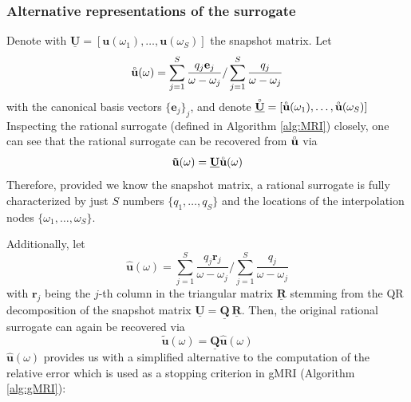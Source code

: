 \documentclass[11pt, a4paper]{article}
\begin{document}
\subsubsection{Alternative representations of the surrogate}
\label{subsubsec:u-ring}
Denote with $\mathbf{\underline{U}} = [\mathbf{u}(\omega_1), \dots, \mathbf{u}(\omega_S)]$
the snapshot matrix. Let 
\begin{equation}
    \accentset{\circ}{\mathbf{u}}(\omega) = \sum_{j=1}^S \frac{q_j \mathbf{e}_j}{\omega - \omega_j}
    / \sum_{j=1}^S \frac{q_j}{\omega - \omega_j} \label{equ:u-ring}
\end{equation}
with the canonical basis vectors $\{ \mathbf{e}_j \}_j$, and denote
$\accentset{\circ}{\mathbf{\underline{U}}} = [\accentset{\circ}{\mathbf{u}}(\omega_1), \dots, \accentset{\circ}{\mathbf{u}}(\omega_S)]$
Inspecting the rational surrogate (defined in Algorithm \ref{alg:MRI}) closely,
one can see that the rational surrogate can be recovered from $\accentset{\circ}{\mathbf{u}}$
via
\begin{equation}
    \mathbf{\tilde{u}}(\omega) = \mathbf{\underline{U}} \accentset{\circ}{\mathbf{u}}(\omega)
\end{equation}
Therefore, provided we know the snapshot matrix, a rational surrogate is
fully characterized by just $S$ numbers $\{q_1, \dots, q_S\}$
and the locations of the interpolation nodes $\{\omega_1, \dots, \omega_S\}$.

Additionally, let
\begin{equation}
    \mathbf{\hat{u}}(\omega) = \sum_{j=1}^S \frac{q_j \mathbf{r}_j}{\omega - \omega_j}
    / \sum_{j=1}^S \frac{q_j}{\omega - \omega_j} \label{equ:u-ring}
\end{equation}
with $\mathbf{r}_j$ being the $j$-th column in the triangular matrix
$\mathbf{\underline{R}}$ stemming from the QR decomposition of the snapshot
matrix $\mathbf{\underline{U}} = \mathbf{\underline{Q}} ~ \mathbf{\underline{R}}$.
Then, the original rational surrogate can again be recovered via
\begin{equation}
    \mathbf{\tilde{u}}(\omega) = \mathbf{\underline{Q}} \mathbf{\hat{u}}(\omega)
\end{equation}
$\mathbf{\hat{u}}(\omega)$ provides us with a simplified alternative to the
computation of the relative error which is used as a stopping criterion in
\acrshort{gMRI} (Algorithm \ref{alg:gMRI}):
\end{document}

